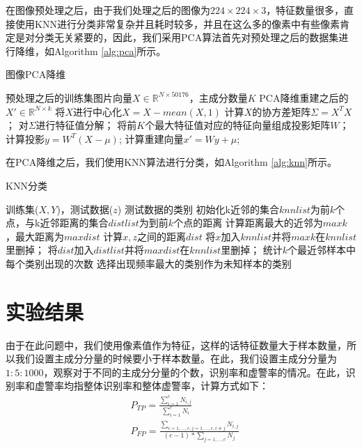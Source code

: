 \documentclass[cn]{elegantbook}
\begin{document}
在图像预处理之后，由于我们处理之后的图像为$224\times224\times 3$，特征数量很多，直接使用KNN进行分类非常复杂并且耗时较多，并且在这么多的像素中有些像素肯定是对分类无关紧要的，因此，我们采用PCA算法首先对预处理之后的数据集进行降维，如Algorithm \ref{alg:pca}所示。

\begin{algorithm}[htb]
	\caption{图像PCA降维}
	\label{alg:pca}
	\begin{algorithmic}[1]
		\Require 预处理之后的训练集图片向量$X\in \mathbb{R}^{N\times50176}$，主成分数量$K$
		\Ensure PCA降维重建之后的$X'\in \mathbb{R}^{N\times k}$
		\State 将$X$进行中心化$X=X-mean(X, 1)$
		\State 计算$X$的协方差矩阵$\Sigma = X^TX$；
		\State 对$\Sigma$进行特征值分解；
		\State 将前$K$个最大特征值对应的特征向量组成投影矩阵$W$；
		\State 计算投影$y=W^T(X-\mu)$;
		\State  计算重建向量$x'=Wy+\mu$;
	\end{algorithmic}
\end{algorithm}

在PCA降维之后，我们使用KNN算法进行分类，如Algorithm \ref{alg:knn}所示。

\begin{algorithm}[htb]
	\caption{KNN分类}
	\label{alg:knn}
	\begin{algorithmic}[1]
		\Require 训练集($X,Y$)，测试数据($z$)
		\Ensure 测试数据的类别
		\State 初始化k近邻的集合$knnlist$为前$k$个点，与k近邻距离的集合$distlist$为到前$k$个点的距离
		\State 计算距离最大的近邻为$maxk$，最大距离为$maxdist$
		\State 计算$x,z$之间的距离$dist$
		\State 将$x$加入$knnlist$并将$maxk$在$knnlist$里删掉；
		\State 将$dist$加入$distlist$并将$maxdist$在$knnlist$里删掉；
		\EndIf
		\EndFor
		\State 统计$k$个最近邻样本中每个类别出现的次数
		\State 选择出现频率最大的类别作为未知样本的类别
	\end{algorithmic}
\end{algorithm}

\section{实验结果}
由于在此问题中，我们使用像素值作为特征，这样的话特征数量大于样本数量，所以我们设置主成分分量的时候要小于样本数量。在此，我们设置主成分分量为$1:5:1000$，观察对于不同的主成分分量的个数，识别率和虚警率的情况。在此，识别率和虚警率均指整体识别率和整体虚警率，计算方式如下：
\begin{equation}
\begin{aligned}
&P_{T P}=\frac{\sum_{i=1}^{c} N_{i, j}}{\sum_{i=1}^{c} N_{i}}\\
&P_{F P}=\frac{\sum_{i=1, \ldots, c, j=1, \ldots, c, i \neq j} N_{i, j}}{(c-1) * \sum_{j=1, \ldots, c} N_{j}}
\end{aligned}
\end{equation}
\end{document}
